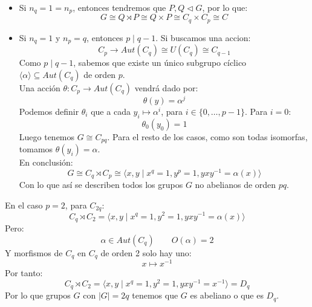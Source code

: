 \begin{itemize}
    \item Si $n_q = 1 = n_p$, entonces tendremos que $P, Q\lhd G$, por lo que:
        \begin{equation*}
            G\cong Q\rtimes P \cong Q\times P \cong C_q \times C_p \cong C_{}
        \end{equation*}
    \item Si $n_q = 1$ y $n_p = q$, entonces $p\mid q-1$. Si buscamos una accion:
        \begin{equation*}
            C_p\to Aut(C_q) \cong U(C_q) \cong C_{q-1}
        \end{equation*}
        Como $p\mid q-1$, sabemos que existe un único subgrupo cíclico $\langle \alpha \rangle \subseteq Aut(C_q) $ de orden $p$.\\

        \noindent
        Una acción $\theta:C_p\to Aut(C_q)$ vendrá dado por:
        \begin{equation*}
            \theta(y) = \alpha^j
        \end{equation*}
        Podemos definir $\theta_i$ que a cada $y_i \longmapsto \alpha^i$, para $i \in \{0,\ldots,p-1\}$. Para $i = 0$:
        \begin{equation*}
            \theta_0(y_0) = 1
        \end{equation*}
        Luego tenemos $G\cong C_{pq}$. Para el resto de los casos, como son todas isomorfas, tomamos $\theta(y_i) = \alpha$.\\

        \noindent
        En conclusión:
        \begin{equation*}
            G\cong C_q\rtimes C_p \cong \langle x,y\mid x^q = 1, y^p = 1, yxy^{-1} = \alpha(x) \rangle 
        \end{equation*}
        Con lo que así se describen todos los grupos $G$ no abelianos de orden $pq$.
\end{itemize}

\begin{ejemplo}
    En el caso $p = 2$, para $C_{2q}$:
    \begin{equation*}
        C_q\rtimes C_2 = \langle x,y\mid x^q = 1, y^2 = 1, yxy^{-1} = \alpha(x) \rangle 
    \end{equation*}
    Pero:
    \begin{equation*}
        \alpha\in Aut(C_q) \qquad O(\alpha) = 2
    \end{equation*}
    Y morfismos de $C_q$ en $C_q$ de orden 2 solo hay uno:
    \begin{equation*}
        x \longmapsto x^{-1}
    \end{equation*}
    Por tanto:
    \begin{equation*}
        C_q\rtimes C_2 = \langle x,y \mid x^q = 1, y^2 = 1, yxy^{-1}= x^{-1} \rangle  = D_q
    \end{equation*}
    Por lo que grupos $G$ con $|G| = 2q$ tenemos que $G$ es abeliano o que es $D_q$.
\end{ejemplo}

